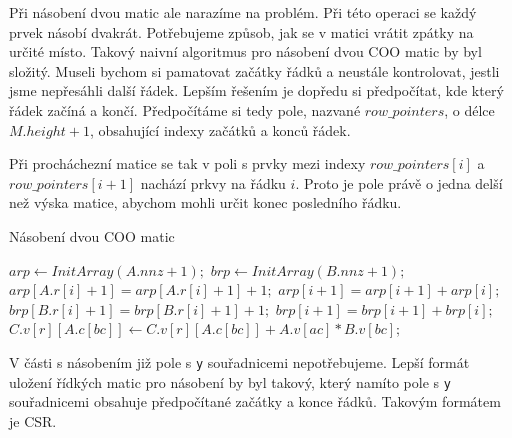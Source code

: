 \label{alg:coo-mmm}
Při násobení dvou matic ale narazíme na problém. Při této operaci se každý prvek násobí dvakrát. Potřebujeme způsob, jak se v matici vrátit zpátky na určité místo. Takový naivní algoritmus pro násobení dvou COO matic by byl složitý. Museli bychom si pamatovat začátky řádků a neustále kontrolovat, jestli jsme nepřesáhli další řádek. Lepším řešením je dopředu si předpočítat, kde který řádek začíná a končí. Předpočítáme si tedy pole, nazvané $row\_pointers$, o délce $M.height + 1$, obsahující indexy začátků a konců řádek.

Při procháchezní matice se tak v poli s prvky mezi indexy $row\_pointers[i]$ a $row\_pointers[i+1]$ nachází prkvy na řádku $i$. Proto je pole právě o jedna delší než výska matice, abychom mohli určit konec posledního řádku.

\begin{algorithm}[H]
	\caption{Násobení dvou COO matic}\label{coo-mmm}
	\begin{algorithmic}[1]
		\State \texttt{$arp\gets InitArray(A.nnz + 1);$}
		\State \texttt{$brp\gets InitArray(B.nnz + 1);$}
			\State \texttt{$arp[A.r[i]+1] = arp[A.r[i]+1] + 1;$}
		\EndFor
			\State \texttt{$arp[i+1] = arp[i+1] + arp[i];$}
		\EndFor
			\State \texttt{$brp[B.r[i]+1] = brp[B.r[i]+1] + 1;$}
		\EndFor
			\State \texttt{$brp[i+1] = brp[i+1] + brp[i];$}
		\EndFor
					\State \texttt{$C.v[r][A.c[bc]] \gets C.v[r][A.c[bc]] + A.v[ac] * B.v[bc];$}
				\EndFor
			\EndFor
		\EndFor
		\EndProcedure
	\end{algorithmic}
\end{algorithm}

V části s násobením již pole s \texttt{y} souřadnicemi nepotřebujeme. Lepší formát uložení řídkých matic pro násobení by byl takový, který namíto pole s \texttt{y} souřadnicemi obsahuje předpočítané začátky a konce řádků. Takovým formátem je CSR.


